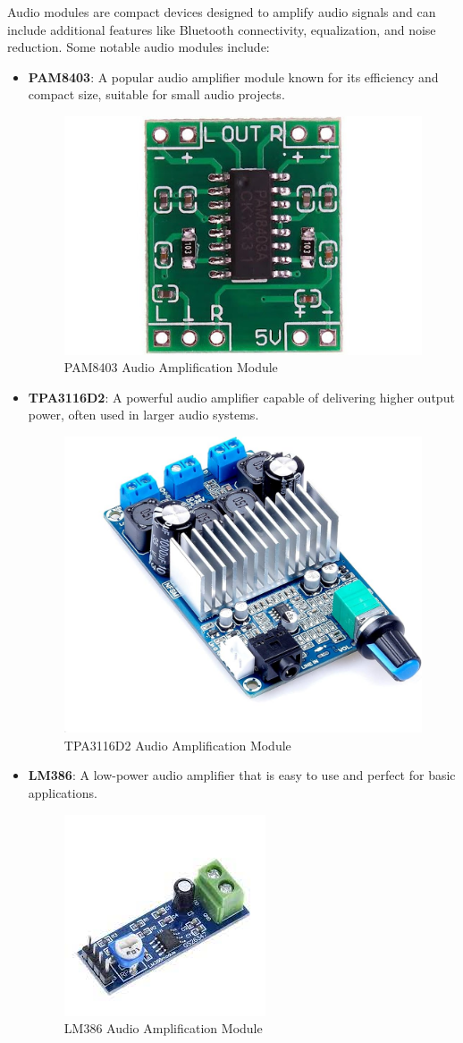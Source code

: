 Audio modules are compact devices designed to amplify audio signals and can include additional features like Bluetooth connectivity, equalization, and noise reduction. Some notable audio modules include:
	\begin{itemize}
	\item \textbf{PAM8403}: A popular audio amplifier module known for its efficiency and compact size, suitable for small audio projects.
	\begin{figure}[h!]
		\centering
		\includegraphics[width=0.3\linewidth]{assets/ch2/PAM8403}
		\caption{PAM8403 Audio Amplification Module}
		\label{fig:pam8403}
	\end{figure}
	
	
	\item \textbf{TPA3116D2}: A powerful audio amplifier capable of delivering higher output power, often used in larger audio systems.
	
	\begin{figure}[h!]
		\centering
		\includegraphics[width=0.3\linewidth]{assets/ch2/TPA3116D2}
		\caption{TPA3116D2 Audio Amplification Module}
		\label{fig:tpa3116d2}
	\end{figure}
	
	\item \textbf{LM386}: A low-power audio amplifier that is easy to use and perfect for basic applications.
	\begin{figure}[h!]
		\centering
		\includegraphics[width=0.3\linewidth]{assets/ch2/LM386}
		\caption{LM386 Audio Amplification Module}
		\label{fig:lm386}
	\end{figure}
	

\end{itemize}
